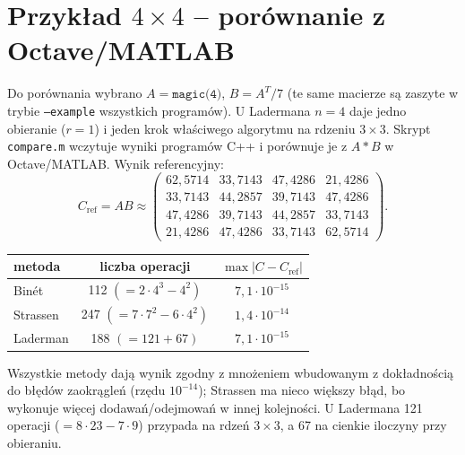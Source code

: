 \documentclass[10pt,a4paper]{article}
\begin{document}
\section{Przykład $4\times4$ -- porównanie z Octave/MATLAB}
Do porównania wybrano $A=\texttt{magic(4)}$, $B=A^{T}/7$ (te same macierze są zaszyte w trybie
\texttt{--example} wszystkich programów). U Ladermana $n=4$ daje jedno obieranie ($r=1$) i jeden krok
właściwego algorytmu na rdzeniu $3\times3$. Skrypt \texttt{compare.m} wczytuje wyniki programów C++ i porównuje je z $A*B$
w Octave/MATLAB. Wynik referencyjny:
\[
C_{\mathrm{ref}} = A B \approx
\begin{pmatrix}
62{,}5714 & 33{,}7143 & 47{,}4286 & 21{,}4286\\
33{,}7143 & 44{,}2857 & 39{,}7143 & 47{,}4286\\
47{,}4286 & 39{,}7143 & 44{,}2857 & 33{,}7143\\
21{,}4286 & 47{,}4286 & 33{,}7143 & 62{,}5714
\end{pmatrix}.
\]
\begin{center}
\begin{tabular}{lcc}
\toprule
metoda & liczba operacji & $\max|C-C_{\mathrm{ref}}|$ \\
\midrule
Binét & 112 $(=2\cdot4^3-4^2)$ & $7{,}1\cdot10^{-15}$ \\
Strassen & 247 $(=7\cdot7^2-6\cdot4^2)$ & $1{,}4\cdot10^{-14}$ \\
Laderman & 188 $(=121+67)$ & $7{,}1\cdot10^{-15}$ \\
\bottomrule
\end{tabular}
\end{center}
Wszystkie metody dają wynik zgodny z mnożeniem wbudowanym z dokładnością do błędów zaokrągleń (rzędu $10^{-14}$);
Strassen ma nieco większy błąd, bo wykonuje więcej dodawań/odejmowań w innej kolejności. U Ladermana 121 operacji
($=8\cdot23-7\cdot9$) przypada na rdzeń $3\times3$, a 67 na cienkie iloczyny przy obieraniu.
\end{document}
